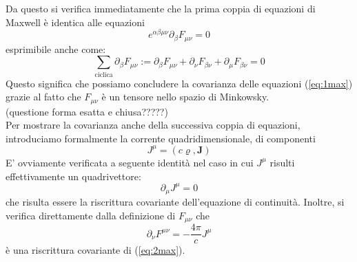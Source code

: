 \documentclass[a4paper,11pt]{book}
\theoremstyle{plain}
\theoremstyle{definition}
\begin{document}
Da questo si verifica immediatamente che la prima coppia di equazioni di Maxwell è identica alle equazioni
\begin{equation}\label{eq:1cov_max}
e^{\alpha\beta\mu\nu}\partial_{\beta}F_{\mu\nu}=0
\end{equation}
esprimibile anche come:
\[
\sum_{\text{ciclica}}\partial_{\beta}F_{\mu\nu} := \partial_{\beta}F_{\mu\nu}+\partial_{\nu}F_{\beta\nu}+\partial_{\mu}F_{\beta\nu}=0
\]
Questo significa che possiamo concludere la covarianza delle equazioni (\ref{eq:1max}) grazie al fatto che $F_{\mu\nu}$ è un tensore nello spazio di Minkowsky. 
\\ (questione forma esatta e chiusa?????)
\\
Per mostrare la covarianza anche della successiva coppia di equazioni, introduciamo formalmente la corrente quadridimensionale, di componenti
\[
J^{\mu} = (c\varrho, \textbf{J})
\]
E' ovviamente verificata a seguente identità nel caso in cui $J^{\mu}$ risulti effettivamente un quadrivettore:
\[
\partial_{\mu}J^{\mu}=0
\]
che risulta essere la riscrittura covariante dell'equazione di continuità. Inoltre, si verifica direttamente dalla definizione di $F_{\mu\nu}$ che
\begin{equation}
\partial_{\nu}F^{\mu\nu} = -\frac{4\pi}{c}J^{\mu}
\end{equation}
è una riscrittura covariante di (\ref{eq:2max}). 
\end{document}
